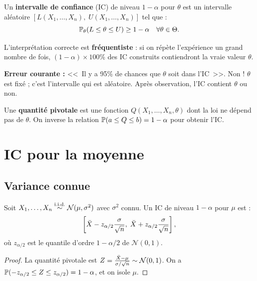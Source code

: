 \begin{definition}
Un \textbf{intervalle de confiance} (IC) de niveau $1-\alpha$ pour $\theta$ est un intervalle al\'eatoire $[L(X_1,\ldots,X_n),\;U(X_1,\ldots,X_n)]$ tel que :
\[
\mathbb{P}_\theta(L\leq\theta\leq U) \geq 1-\alpha \quad \forall\theta\in\Theta.
\]
\end{definition}

\begin{attention}
L'interpr\'etation correcte est \textbf{fr\'equentiste} : si on r\'ep\`ete l'exp\'erience un grand nombre de fois, $(1-\alpha)\times 100\%$ des IC construits contiendront la vraie valeur $\theta$.

\medskip
\textbf{Erreur courante :} <<~Il y a 95\% de chances que $\theta$ soit dans l'IC~>>. Non ! $\theta$ est fix\'e ; c'est l'intervalle qui est al\'eatoire. Apr\`es observation, l'IC contient $\theta$ ou non.
\end{attention}

\begin{definition}
Une \textbf{quantit\'e pivotale} est une fonction $Q(X_1,\ldots,X_n,\theta)$ dont la loi ne d\'epend pas de $\theta$. On inverse la relation $\mathbb{P}(a\leq Q\leq b)=1-\alpha$ pour obtenir l'IC.
\end{definition}

\section{IC pour la moyenne}

\subsection{Variance connue}

\begin{theoreme}
Soit $X_1,\ldots,X_n\overset{\text{i.i.d.}}{\sim}\mathcal{N}(\mu,\sigma^2)$ avec $\sigma^2$ connu. Un IC de niveau $1-\alpha$ pour $\mu$ est :
\[
\left[\bar{X} - z_{\alpha/2}\frac{\sigma}{\sqrt{n}},\;\bar{X} + z_{\alpha/2}\frac{\sigma}{\sqrt{n}}\right],
\]
o\`u $z_{\alpha/2}$ est le quantile d'ordre $1-\alpha/2$ de $\mathcal{N}(0,1)$.
\end{theoreme}

\begin{proof}
La quantit\'e pivotale est $Z=\frac{\bar{X}-\mu}{\sigma/\sqrt{n}}\sim\mathcal{N}(0,1)$. On a $\mathbb{P}(-z_{\alpha/2}\leq Z\leq z_{\alpha/2})=1-\alpha$, et on isole $\mu$.
\end{proof}

